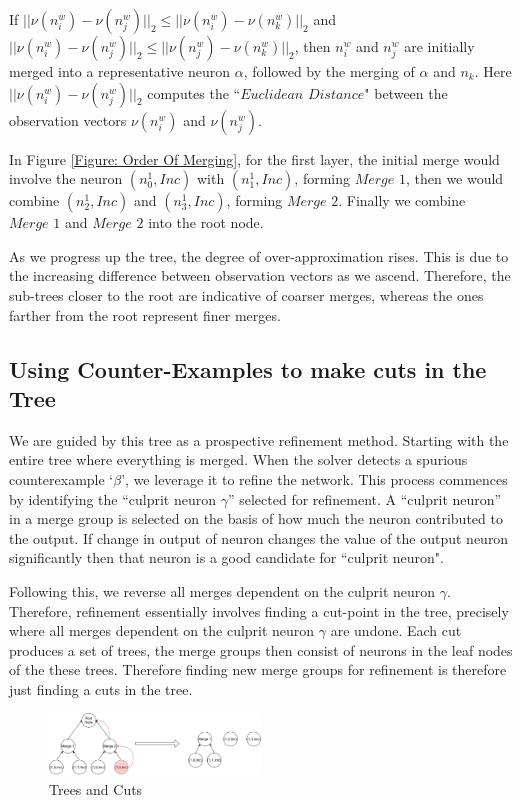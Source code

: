 If $||\mathcal{\nu}(n_i^{w}) - \nu(n_j^{w})||_{2} \leq ||\nu(n_i^{w}) - \nu(n_k^{w})||_{2}$ and $||\nu(n_i^{w}) - \nu(n_j^{w})||_2 \leq ||\nu(n_j^{w}) - \nu(n_k^{w})||_{2}$, then $n_i^{w}$ and $n_j^{w}$ are initially merged into a representative neuron $\alpha$, followed by the merging of $\alpha$ and $n_k$. Here $||\nu(n_i^{w}) - \nu(n_j^{w})||_{2}$ computes the ``$\textit{Euclidean  Distance}$" between the observation vectors $\nu(n_i^{w})$ and  $\nu(n_j^{w})$.


In Figure \ref{Figure: Order Of Merging}, for the first layer, the initial merge would involve the neuron $(n_0^{1},Inc)$ with $(n_1^{1},Inc)$, forming $\textit{Merge 1}$, then we would combine $(n_2^{1},Inc)$ and $(n_3^{1},Inc)$, forming $\textit{Merge 2}$. Finally we combine $\textit{Merge 1}$ and $\textit{Merge 2}$ into the root node. 

As we progress up the tree, the degree of over-approximation rises. This is due to the increasing difference between observation vectors as we ascend. Therefore, the sub-trees closer to the root are indicative of coarser merges, whereas the ones farther from the root represent finer merges. 



\subsection{Using Counter-Examples to make cuts in the Tree} 
We are guided by this tree as a prospective refinement method. Starting with the entire tree where everything is merged. When the solver detects a spurious counterexample `$\beta$', we leverage it to refine the network. This process commences by identifying the ``culprit neuron $\gamma$'' selected for refinement. A ``culprit neuron'' in a merge group is selected on the basis of how much the neuron contributed to the output. If change in output of  neuron changes the value of the output neuron significantly then that neuron is a good candidate for ``culprit neuron". 

Following this, we reverse all merges dependent on the culprit neuron $\gamma$. Therefore, refinement essentially involves finding a cut-point in the tree, precisely where all merges dependent on the culprit neuron $\gamma$ are undone. Each cut produces a set of trees, the merge groups then consist of neurons in the leaf nodes of the  these trees. Therefore finding new merge groups for refinement is therefore just finding a cuts in the tree.

\begin{figure}
    \centering
    \includegraphics[width = 0.5\textwidth]{diagrams/before_and_after_cut_2.pdf}
    \caption{Trees and Cuts}
    \label{Figure 2}
\end{figure}

